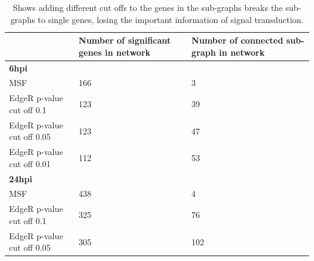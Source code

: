 \documentclass[10pt,a4paper,twocolumn]{article}
\begin{document}
\begin{table}[]
	\centering
	\caption{Shows adding different cut offs to the genes in the sub-graphs breaks the sub-graphs to single genes, losing the important information of signal transduction. }
	\label{my-label}
	\begin{tabular}{lll}
		\hline
		\multicolumn{1}{|l|}{}                           & \multicolumn{1}{l|}{\textbf{Number of significant genes in network}} & \multicolumn{1}{l|}{\textbf{Number of connected sub-graph in network}} \\ \hline
		\multicolumn{1}{|l|}{\textbf{6hpi}}              & \multicolumn{1}{l|}{}                                                & \multicolumn{1}{l|}{}                                                  \\ \hline
		\multicolumn{1}{|l|}{MSF}                        & \multicolumn{1}{l|}{166}                                             & \multicolumn{1}{l|}{3}                                                 \\ \hline
		\multicolumn{1}{|l|}{EdgeR p-value cut off 0.1}  & \multicolumn{1}{l|}{123}                                             & \multicolumn{1}{l|}{39}               \\ \hline
		\multicolumn{1}{|l|}{EdgeR p-value cut off 0.05} & \multicolumn{1}{l|}{123}                                             & \multicolumn{1}{l|}{47}                \\ \hline
		\multicolumn{1}{|l|}{EdgeR p-value cut off 0.01} & \multicolumn{1}{l|}{112}                                             & \multicolumn{1}{l|}{53}               \\ \hline
		\multicolumn{1}{|l|}{\textbf{24hpi}}             & \multicolumn{1}{l|}{}                                                & \multicolumn{1}{l|}{}                                                  \\ \hline
		\multicolumn{1}{|l|}{MSF}                        & \multicolumn{1}{l|}{438}                                             & \multicolumn{1}{l|}{4}                                                 \\ \hline
		\multicolumn{1}{|l|}{EdgeR p-value cut off 0.1}  & \multicolumn{1}{l|}{325}                                             & \multicolumn{1}{l|}{76}      \\ \hline
		\multicolumn{1}{|l|}{EdgeR p-value cut off 0.05} & \multicolumn{1}{l|}{305}                                             & \multicolumn{1}{l|}{102}         \\ \hline

\end{tabular}
\end{table}
\end{document}
